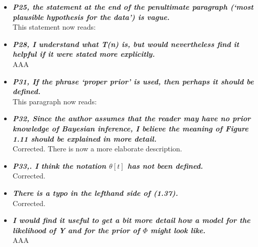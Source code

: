 \documentclass[english]{article}
\begin{document}
\begin{itemize}
\item {
{\it
\textbf{
P25, the statement at the end of the penultimate paragraph (`most plausible hypothesis for the data') is vague.
}%
}%
}%
\\
This statement now reads:

\begin{quote}
\myeditsveight
\end{quote}









\item {
{\it
\textbf{
P28, I understand what T(n) is, but would nevertheless find it helpful if it were stated more explicitly.
}%
}%
}%
\\
AAA



\item {
{\it
\textbf{
P31, If the phrase `proper prior' is used, then perhaps it should be defined.
}%
}%
}%
\\
This paragraph now reads:

\begin{quote}
\myeditsvnine
\end{quote}


\item {
{\it
\textbf{
P32, Since the author assumes that the reader may have no prior knowledge of Bayesian inference, I believe the meaning of Figure 1.11 should be explained in more detail.
}%
}%
}%
\\
Corrected. There is now a more elaborate description.



\item {
{\it
\textbf{
P33,. I think the notation $\theta[t]$ has not been defined.
}%
}%
}%
\\
Corrected.




\item {
{\it
\textbf{
There is a typo in the lefthand side of (1.37).
}%
}%
}%
\\
Corrected.


\item {
{\it
\textbf{
I would find it useful to get a bit more detail how a model for the likelihood of Y and for the prior of $\Phi$ might look like.
}%
}%
}%
\\
AAA



\end{itemize}
\end{document}
